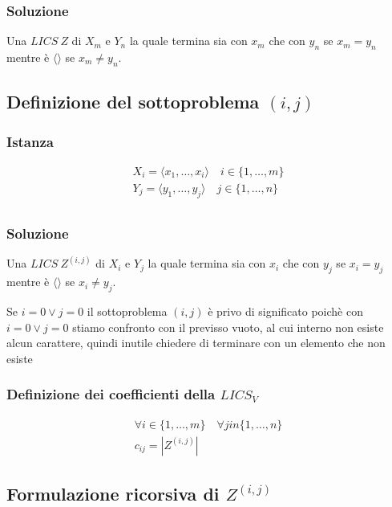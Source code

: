 \subsubsection{Soluzione}
Una $LICS\ Z$ di $X_m$ e $Y_n$ la quale termina sia con $x_m$ che con $y_n$ se $x_m = y_n$ mentre è $\langle \rangle$ se $x_m \not = y_n$.

\subsection{Definizione del sottoproblema $(i,j)$}
\subsubsection{Istanza}
{
    \large

    \begin{gather*}
        X_i = \langle x_1, \dots, x_i \rangle \quad i \in \{1, \dots, m\} \\
        Y_j = \langle y_1, \dots, y_j \rangle \quad j \in \{1, \dots, n\} \\
    \end{gather*}
}

\subsubsection{Soluzione}
Una $LICS\ Z^{(i,j)}$ di $X_i$ e $Y_j$ la quale termina sia con $x_i$ che con $y_j$ se $x_i=y_j$ mentre è $\langle \rangle$ se $x_i \not = y_j$.

Se $i=0 \lor j=0$ il sottoproblema $(i,j)$ è privo di significato poichè con $i=0 \lor j=0$ stiamo confronto con il previsso vuoto, al cui interno non esiste alcun carattere, quindi inutile chiedere di terminare con un elemento che non esiste

\subsubsection{Definizione dei coefficienti della $LICS_V$}
{
    \large

    \begin{gather*}
        \forall i \in \{1,\dots,m\} \quad \forall j in \{1, \dots, n\} \\
        c_{ij} = |Z^{(i,j)}| 
    \end{gather*}
}

\newpage
\subsection{Formulazione ricorsiva di $Z^{(i,j)}$}
